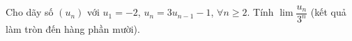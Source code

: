 \begin{ex}
Cho dãy số $(u_n)$ với $u_1=-2$, $u_n=3u_{n-1}-1$, $\forall n\ge2$. Tính $\lim\dfrac{u_n}{3^n}$ (kết quả làm tròn đến hàng phần mười).
\end{ex}
